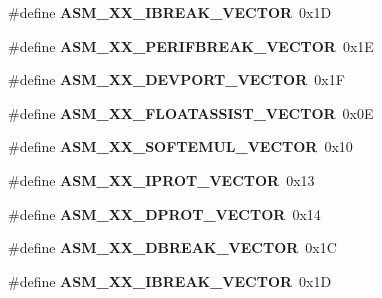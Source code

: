 \begin{DoxyCompactItemize}
\item 
\mbox{\label{group__ppc__exc_ga1eae8aeddcbbd0661398d637c09369b3}} 
\#define {\bfseries A\+S\+M\+\_\+X\+X\+\_\+\+I\+B\+R\+E\+A\+K\+\_\+\+V\+E\+C\+T\+OR}~0x1D
\item 
\mbox{\label{group__ppc__exc_gae612d1935d324470efa078024038916b}} 
\#define {\bfseries A\+S\+M\+\_\+X\+X\+\_\+\+P\+E\+R\+I\+F\+B\+R\+E\+A\+K\+\_\+\+V\+E\+C\+T\+OR}~0x1E
\item 
\mbox{\label{group__ppc__exc_gaec6e4608a9382dd568e4a26755fc9572}} 
\#define {\bfseries A\+S\+M\+\_\+X\+X\+\_\+\+D\+E\+V\+P\+O\+R\+T\+\_\+\+V\+E\+C\+T\+OR}~0x1F
\item 
\mbox{\label{group__ppc__exc_ga28cd361f27108b1d6f4b84d46663f93c}} 
\#define {\bfseries A\+S\+M\+\_\+X\+X\+\_\+\+F\+L\+O\+A\+T\+A\+S\+S\+I\+S\+T\+\_\+\+V\+E\+C\+T\+OR}~0x0E
\item 
\mbox{\label{group__ppc__exc_gab67a8c8e0898402ce8e5ed47d90a1cdf}} 
\#define {\bfseries A\+S\+M\+\_\+X\+X\+\_\+\+S\+O\+F\+T\+E\+M\+U\+L\+\_\+\+V\+E\+C\+T\+OR}~0x10
\item 
\mbox{\label{group__ppc__exc_ga7d9040b96eb2c1d0c5546310ba551b25}} 
\#define {\bfseries A\+S\+M\+\_\+X\+X\+\_\+\+I\+P\+R\+O\+T\+\_\+\+V\+E\+C\+T\+OR}~0x13
\item 
\mbox{\label{group__ppc__exc_ga4a9f9f5e41ec839e634fd631ab8c72f6}} 
\#define {\bfseries A\+S\+M\+\_\+X\+X\+\_\+\+D\+P\+R\+O\+T\+\_\+\+V\+E\+C\+T\+OR}~0x14
\item 
\mbox{\label{group__ppc__exc_ga77722dfb6a5ae75756012013aa387606}} 
\#define {\bfseries A\+S\+M\+\_\+X\+X\+\_\+\+D\+B\+R\+E\+A\+K\+\_\+\+V\+E\+C\+T\+OR}~0x1C
\item 
\mbox{\label{group__ppc__exc_ga8dc939867cbd964907bfbdb34e4cdce4}} 
\#define {\bfseries A\+S\+M\+\_\+X\+X\+\_\+\+I\+B\+R\+E\+A\+K\+\_\+\+V\+E\+C\+T\+OR}~0x1D
\item 
\mbox{\label{group__ppc__exc_gad9d893b55f9979945a192317925b59ff}} 

\end{DoxyCompactItemize}
